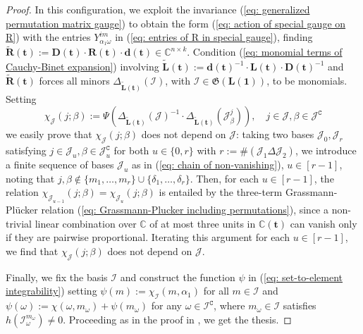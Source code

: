 \documentclass[10pt]{article}
\theoremstyle{remark}%
\theoremstyle{definition}%
\begin{document}
\begin{proof}
In this configuration, we exploit the invariance (\ref{eq: generalized permutation matrix gauge}) to obtain the form (\ref{eq: action of special gauge on R}) with the entries $Y_{\alpha_{1}\omega}^{im}$ in (\ref{eq: entries of R in special gauge}), finding $\tilde{\mathbf{R}}(\mathbf{t}):=\mathbf{D}(\mathbf{t})\cdot \mathbf{R}(\mathbf{t})\cdot \mathbf{d}(\mathbf{t})\in\mathbb{C}^{n\times k}$. Condition (\ref{eq: monomial terms of Cauchy-Binet expansion}) involving $\tilde{\mathbf{L}}(\mathbf{t}):=\mathbf{d}(\mathbf{t})^{-1}\cdot \mathbf{L}(\mathbf{t})\cdot \mathbf{D}(\mathbf{t})^{-1}$ and $\tilde{\mathbf{R}}(\mathbf{t})$ forces all minors $\Delta_{\tilde{\mathbf{L}}(\mathbf{t})}(\mathcal{I})$, with $\mathcal{I}\in\mathfrak{G}(\mathbf{L}(\mathbf{1}))$, to be monomials. Setting 
\begin{equation}
\chi_{\mathcal{J}}(j;\beta):=\Psi\left(\Delta_{\tilde{\mathbf{L}}(\mathbf{t})}(\mathcal{J})^{-1}\cdot \Delta_{\tilde{\mathbf{L}}(\mathbf{t})}(\mathcal{J}_{\beta}^{j})\right),\quad j\in \mathcal{J},\beta\in\mathcal{J}^{\mathtt{C}}
\label{eq: quantification distinguishable columns}
 \end{equation} 
we easily prove that $\chi_{\mathcal{J}}(j;\beta)$ does not depend on $\mathcal{J}$: taking two bases $\mathcal{J}_{0},\mathcal{J}_{r}$ satisfying $j\in \mathcal{J}_{u},\beta\in\mathcal{J}_{u}^{\mathtt{C}}$ for both $u\in\{0,r\}$ with $r:=\#(\mathcal{J}_{1}\Delta\mathcal{J}_{2})$, we introduce a finite sequence of bases $\mathcal{J}_{u}$ as in (\ref{eq: chain of non-vanishing}), $u\in[r-1]$, noting that $j,\beta\notin\{m_{1},\dots,m_{r}\}\cup\{\delta_{1},\dots,\delta_{r}\}$. Then, for each $u\in[r-1]$, the relation $\chi_{\mathcal{J}_{u-1}}(j;\beta)=\chi_{\mathcal{J}_{u}}(j;\beta)$ is entailed by the three-term Grassmann-Pl\"{u}cker relation (\ref{eq: Grassmann-Plucker including permutations}), since a non-trivial linear combination over $\mathbb{C}$ of at most three units in $\mathbb{C}(\mathbf{t})$ can vanish only if they are pairwise proportional. Iterating this argument for each $u\in[r-1]$, we find that $\chi_{\mathcal{J}}(j;\beta)$ does not depend on $\mathcal{J}$.  

Finally, we fix the basis $\mathcal{I}$ and construct the function $\psi$ in (\ref{eq: set-to-element integrability}) setting $\psi(m):=\chi_{\mathcal{I}}(m,\alpha_{1})$ for all $m\in\mathcal{I}$ and $\psi(\omega):=\chi(\omega,m_{\omega})+\psi(m_{\omega})$ for any $\omega\in\mathcal{I}^{\mathtt{C}}$, where $m_{\omega}\in\mathcal{I}$ satisfies $h(\mathcal{I}_{\omega}^{m_{\omega}})\neq0$. Proceeding as in the proof in \cite[Th.15]{Angelelli2019}, we get the thesis. 
\end{proof}
\end{document}
